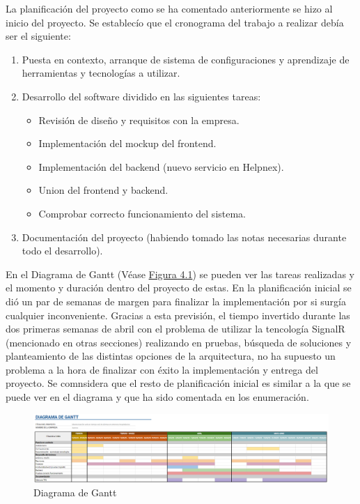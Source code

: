 La planificación del proyecto como se ha comentado anteriormente se hizo al inicio del proyecto. Se establecío que el cronograma del trabajo a realizar debía ser el siguiente:
\begin{enumerate}
    \item Puesta en contexto, arranque de sistema de configuraciones y aprendizaje de herramientas y tecnologías a utilizar.
    \item Desarrollo del software dividido en las siguientes tareas:
    \begin{itemize}
        \item Revisión de diseño y requisitos con la empresa.
        \item Implementación del mockup del frontend.
        \item Implementación del backend (nuevo servicio en Helpnex).
        \item Union del frontend y backend.
        \item Comprobar correcto funcionamiento del sistema.
    \end{itemize}
    \item Documentación del proyecto (habiendo tomado las notas necesarias durante todo el desarrollo).
\end{enumerate}

En el Diagrama de Gantt (Véase \hyperref[fig:gantt]{Figura 4.1}) se pueden ver las tareas realizadas y el momento y duración dentro del proyecto de estas. En la planificación inicial se dió un par de semanas de margen para finalizar la implementación por si surgía cualquier inconveniente. Gracias a esta previsión, el tiempo invertido durante las dos primeras semanas de abril con el problema de utilizar la tencología SignalR (mencionado en otras secciones) realizando en pruebas, búsqueda de soluciones y planteamiento de las distintas opciones de la arquitectura, no ha supuesto un problema a la hora de finalizar con éxito la implementación y entrega del proyecto. Se comnsidera que el resto de planificación inicial es similar a la que se puede ver en el diagrama y que ha sido comentada en los enumeración. 

\begin{landscape}
    \begin{figure}[!ht]
        \centering
        \includegraphics[width=25cm]{Imagenes/Diagrama-Gantt.PNG}
        \caption{Diagrama de Gantt}
        \label{fig:gantt}
    \end{figure}
\end{landscape}



